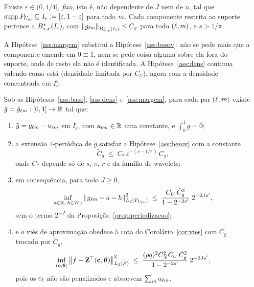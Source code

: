 \documentclass[11pt,a4paper]{article}
\begin{document}
\begin{assumption}\label{ass:margem}
Existe $\varepsilon \in (0, 1/4]$, \emph{fixo}, isto é, não dependente de $J$
nem de $n$, tal que $\operatorname{supp} P_{U_{m}} \subseteq
I_{\varepsilon} := [\varepsilon, 1-\varepsilon]$ para todo $m$. Cada
componente restrita ao suporte pertence a
$B^{s}_{\pi,r}(I_{\varepsilon})$, com
$\left\lVert g_{\ell m} \right\rVert_{B^{s}_{\pi,r}(I_{\varepsilon})} \le C_{g}$ para
todo $(\ell,m)$, e $s > 1/\pi$.
\end{assumption}

A Hipótese~\ref{ass:margem} substitui a Hipótese~\ref{ass:besov}: não se
pede mais que a componente emende em $0 \equiv 1$, nem se pede coisa alguma
sobre ela fora do suporte, onde de resto ela não é identificada. A
Hipótese~\ref{ass:dens} continua valendo como está (densidade limitada por
$C_{U}$), agora com a densidade concentrada em $I_{\varepsilon}^{q}$.

\setcounter{lemma}{9}
\begin{lemma}\label{lem:extensao}
Sob as Hipóteses~\ref{ass:base}, \ref{ass:dens} e~\ref{ass:margem}, para cada
par $(\ell,m)$ existe $\tilde g = \tilde g_{\ell m} : [0,1] \to \mathbb{R}$ tal que:
\begin{enumerate}[label=\textup{(\roman*)}, nosep]
  \item $\tilde g = g_{\ell m} - a_{\ell m}$ em $I_{\varepsilon}$, com
    $a_{\ell m} \in \mathbb{R}$ uma constante, e $\int_{0}^{1}\tilde g = 0$;
  \item a extensão $1$-periódica de $\tilde g$ satisfaz a
    Hipótese~\ref{ass:besov} com a constante
    \[
      \tilde C_{g} \;\le\; C_{\ast}\,\varepsilon^{-(s - 1/\pi)}\,C_{g},
    \]
    onde $C_{\ast}$ depende só de $s$, $\pi$, $r$ e da família de wavelets;
  \item em consequência, para todo $J \ge 0$,
    \[
      \inf_{a\in\mathbb{R},\;h \in W_{J}}
      \left\lVert g_{\ell m} - a - h \right\rVert_{L_{2}(P_{U_{m}})}^{2}
      \;\le\; \frac{C_{U}\,\tilde C_{g}^{2}}{1 - 2^{-2s'}}\;2^{-2Js'},
    \]
    sem o termo $2^{-J}$ da Proposição~\ref{prop:periodizacao};
  \item e o viés de aproximação obedece à cota do Corolário~\ref{cor:vies} com
    $C_{g}$ trocado por $\tilde C_{g}$,
    \[
      \inf_{(\mathbf{c},\boldsymbol{\theta})} \left\lVert f - \mathbf{Z}^{\top}(\mathbf{c},\boldsymbol{\theta}) \right\rVert_{L_{2}(P)}^{2}
      \;\le\; \frac{(pq)^{2}C_{X}^{2}C_{U}\,\tilde C_{g}^{2}}{1 - 2^{-2s'}}\;
      2^{-2Js'},
    \]
    pois os $c_{\ell}$ não são penalizados e absorvem
    $\sum_{m} a_{\ell m}$.
\end{enumerate}
\end{lemma}
\end{document}
